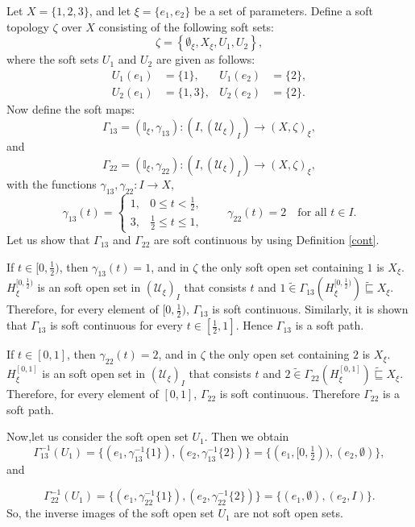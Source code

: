 \documentclass[preprint,12pt]{elsarticle}
\begin{document}
\begin{ex}\em{
Let $X = \{1, 2, 3\}$, and let $\xi = \{e_1, e_2\}$ be a set of parameters. Define a soft topology $\zeta$ over $X$ consisting of the following soft sets:
\[
\zeta = \left\{ \emptyset_\xi, X_\xi, U_1, U_2 \right\},
\]
where the soft  sets $U_1$ and $U_2$ are given as follows:
\begin{align*}
U_1(e_1) &= \{1\},       & U_1(e_2) &= \{2\}, \\
U_2(e_1) &= \{1, 3\},    & U_2(e_2) &= \{2\}.
\end{align*}
Now define the soft maps:
\[
\Gamma_{13} =(\mathbb{I}_\xi , \gamma_{13}) : (I,(\mathscr{U}_{\xi})_{I})\to  (X,\zeta)_\xi,
\] and \[
\Gamma_{22} =(\mathbb{I}_\xi , \gamma_{22}) : (I,(\mathscr{U}_{\xi})_{I})\to  (X,\zeta)_\xi,
\]
with the functions \(\gamma_{13},\gamma_{22}:I \to X \),
\[
\gamma_{13}(t) =
\begin{cases}
1, & 0 \leq t < \frac{1}{2}, \\
3, & \frac{1}{2} \leq t \leq 1,
\end{cases}
\qquad \gamma_{22}(t) = 2 \quad \text{for all } t \in I.
\]
Let us show that $\Gamma_{13}$ and $\Gamma_{22}$ are soft continuous by using Definition \ref{cont}.

If $t\in [0,\frac{1}{2})$, then $\gamma_{13}(t)=1$, and in $\zeta$ the only soft open set containing $1$ is $X_\xi$.  $H^{[0,\frac{1}{2})}_\xi$ is an soft open set in $(\mathscr{U}_{\xi})_{I}$ that consists $t$ and $1 \widetilde{\in}\Gamma_{13}(H^{[0,\frac{1}{2})}_\xi)\widetilde{\sqsubseteq} X_\xi$. Therefore, for every element of $[0,\frac{1}{2})$, $\Gamma_{13}$ is soft continuous. Similarly, it is shown that $\Gamma_{13}$ is soft continuous for every $t \in [\frac{1}{2},1]$. Hence $\Gamma_{13}$ is a soft path.

If $t\in [0,1]$, then $\gamma_{22}(t)=2$, and in $\zeta$ the only open set containing $2$ is $X_\xi$.  $H^{[0,1]}_\xi$ is an soft open set in $(\mathscr{U}_{\xi})_{I}$ that consists $t$ and $2 \widetilde{\in}\Gamma_{22}(H^{[0,1]}_\xi)\widetilde{\sqsubseteq} X_\xi$. Therefore, for every element of $[0,1]$, $\Gamma_{22}$ is soft continuous. Therefore $\Gamma_{22}$ is a soft path.



Now,let us consider the soft open set $U_1$. Then we obtain
\[
\Gamma_{13}^{-1}(U_1) = \{(e_1, \gamma_{13}^{-1}\{1\}), (e_2, \gamma_{13}^{-1}\{2\})\} = \{(e_1, [0,\tfrac{1}{2})), (e_2, \emptyset)\},
\]
and

\[
\Gamma_{22}^{-1}(U_1) = \{(e_1, \gamma_{22}^{-1}\{1\}), (e_2, \gamma_{22}^{-1}\{2\})\} = \{(e_1, \emptyset), (e_2, I)\}.
\]
So, the inverse images of the soft open set $U_1$  are not soft open sets.}
\end{ex}
\end{document}
